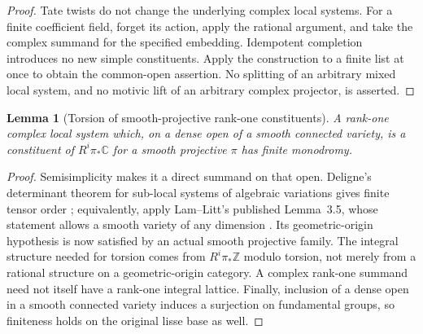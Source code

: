 \documentclass[11pt]{article}
\numberwithin{equation}{section}
\newtheorem{lemma}[lemma]{Lemma}
\theoremstyle{definition}
\theoremstyle{remark}
\newcommand{\C}{\mathbb C}
\begin{document}
\begin{proof}
Tate twists do not change the underlying complex local systems. For a
finite coefficient field, forget its action, apply the rational argument,
and take the complex summand for the specified embedding. Idempotent
completion introduces no new simple constituents. Apply the construction
to a finite list at once to obtain the common-open assertion. No splitting
of an arbitrary mixed local system, and no motivic lift of an arbitrary
complex projector, is asserted.
\end{proof}

\begin{lemma}[Torsion of smooth-projective rank-one constituents]
\label{lem:projective-rank-one}
A rank-one complex local system which, on a dense open of a smooth
connected variety, is a constituent of $R^i\pi_*\C$ for a smooth
projective $\pi$ has finite monodromy.
\end{lemma}
\begin{proof}
Semisimplicity makes it a direct summand on that open. Deligne's
determinant theorem for sub-local systems of algebraic variations gives
finite tensor order
\cite[Corollary~4.2.8(iii)(b)]{DeligneHodgeII}; equivalently, apply
Lam--Litt's published Lemma~3.5, whose statement allows a smooth variety
of any dimension \cite{LamLitt}. Its geometric-origin hypothesis is now
satisfied by an actual smooth projective family. The integral structure
needed for torsion comes from $R^i\pi_*\mathbb Z$ modulo torsion, not
merely from a rational structure on a geometric-origin category. A
complex rank-one summand need not itself have a rank-one integral lattice.
Finally, inclusion of a dense open in a smooth connected variety induces
a surjection on fundamental groups, so finiteness holds on the original
lisse base as well.
\end{proof}
\end{document}
